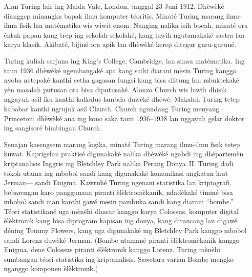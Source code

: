 \documentclass[../../../include/open-logic-section]{subfiles}
\begin{document}


Alan Turing lair ing Maida Vale, London,
tanggal 23 Juni 1912. Dhèwèké dianggep
minangka bapak ilmu komputer téoritis.
Minaté Turing marang ilmu-ilmu fisik
lan matématika wis wiwit enom.
Nanging nalika isih bocah, minaté
ora éntuk papan kang trep ing
sekolah-sekolahé, kang luwih
ngutamakaké sastra lan karya
klasik. Akibaté, bijiné ora
apik lan dhèwèké kerep
ditegur guru-guruné.


Turing kuliah sarjana ing King's
College, Cambridge, lan sinau
matématika. Ing taun 1936
dhèwèké ngembangaké apa kang
saiki diarani mesin Turing
kanggo nyoba netepaké
kanthi cetha gagasan fungsi
kang bisa diitung lan
mbuktekaké yèn masalah
putusan ora bisa diputusaké.
Alonzo Church wis luwih
dhisik nggayuh asil iku
kanthi kalkulus lambda
duwèké dhéwé. Makalah
Turing tetep kababar
kanthi ngrujuk asil Church.
Church ngundang Turing
menyang Princeton; dhèwèké
ana ing kono saka taun
1936--1938 lan nggayuh
gelar doktor ing sangisoré
bimbingan Church.

Senajan kasengsem marang
logika, minaté Turing
marang ilmu-ilmu fisik
tetep kuwat. Kaprigelan
praktisé digunakaké
nalika dhèwèké ngabdi
ing dhépartemèn
kriptanalisis Inggris
ing Bletchley Park
nalika Perang Donya~II.
Turing dadi tokoh utama
ing mbobol sandi kang
digunakaké komunikasi
angkatan laut Jerman---
sandi Enigma. Kawruhé
Turing ngenani statistika
lan kriptografi, bebarengan
karo panggunaan piranti
èlèktromèkanik, ndadèkaké
timiné bisa mbobol
sandi mau kanthi gawé
mesin pambuka sandi
kang diarani ``bombe.''
Téori statistikané uga
mènèhi dhasar kanggo karya
Colossus, komputer digital
èlèktronik kang bisa diprogram
kapisan ing donya,
kang dirancang lan digawé
déning Tommy Flowers, kang uga
digunakaké ing
Bletchley Park kanggo
mbobol sandi Lorenz
duwèké Jerman.
(Bombe utamané piranti èlèktromèkanik kanggo Enigma, dene Colossus piranti èlèktronik kanggo Lorenz. Turing mènèhi sumbangan téori statistika ing kriptanalisis. Sawetara varian Bombe mengko nganggo komponen èlèktronik.)
\end{document}
